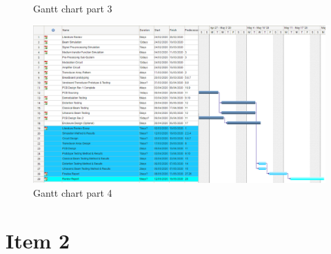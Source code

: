 \begin{appendices}
\begin{figure}[h]
    \caption{Gantt chart part 3}
    \label{fig:gantt3}
\end{figure}
\begin{figure}[h]
    \centering
    \includegraphics[width=\textwidth]{Figures/Gantt4.PNG}
    \caption{Gantt chart part 4}
    \label{fig:gantt4}
\end{figure}
\section{Item 2}

\end{appendices}
